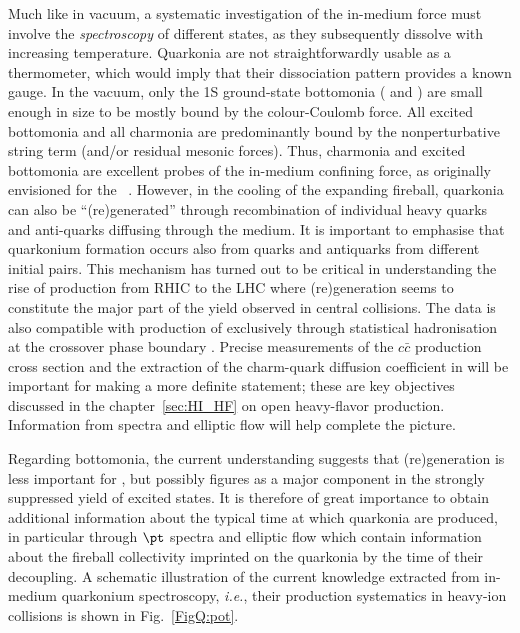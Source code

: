 \documentclass[../report.tex]{subfiles}
\begin{document}
Much like in vacuum, a systematic investigation of the in-medium force must involve the {\em spectroscopy} of different states, as they subsequently dissolve with increasing temperature. Quarkonia are not straightforwardly usable as a thermometer, which would imply that their dissociation pattern provides a known gauge. In the vacuum, only the 1S ground-state bottomonia ( and \PGhb) are small enough in size to be mostly bound by the colour-Coulomb force. All excited bottomonia and all charmonia are predominantly bound by the nonperturbative string term (and/or residual mesonic forces). 
Thus, charmonia and excited bottomonia are excellent probes of the in-medium confining force, as originally envisioned for the \PJgy~\cite{Matsui:1986dk}.
However, in the cooling of the expanding fireball, quarkonia can also be ``(re)generated'' through recombination of individual heavy quarks and anti-quarks diffusing through the medium. It is important to emphasise that quarkonium formation occurs also from quarks and antiquarks from different initial pairs.
This mechanism \cite{BraunMunzinger:2000px,Thews:2000rj,Young:2008he} has turned out to be critical in understanding the rise of \PJgy production from RHIC to the LHC where (re)generation seems to constitute the major part of the yield observed in central \PbPb collisions.
The data is also compatible with production of \PJgy exclusively through statistical hadronisation at the crossover phase boundary \cite{Andronic:2017pug}.
Precise measurements of the $c\bar{c}$ production cross section and the extraction of the charm-quark diffusion coefficient in \RunsThreeFour will be important for making a more definite statement; these are key objectives discussed in the chapter~\ref{sec:HI_HF} on open heavy-flavor production. Information from \pt spectra and elliptic flow will help complete the picture.

Regarding bottomonia, the current understanding suggests that (re)generation is less important for , but possibly figures as a major component in the strongly suppressed yield of excited states. It is therefore of great importance to obtain additional information about the typical time at which quarkonia are produced, in particular through $\pt$ spectra and elliptic flow which contain information about the fireball collectivity imprinted on the quarkonia by the time of their decoupling. A schematic illustration of the current knowledge extracted from in-medium quarkonium spectroscopy, {\it i.e.}, their production systematics in heavy-ion collisions is shown in Fig.~\ref{FigQ:pot}.        
\end{document}
